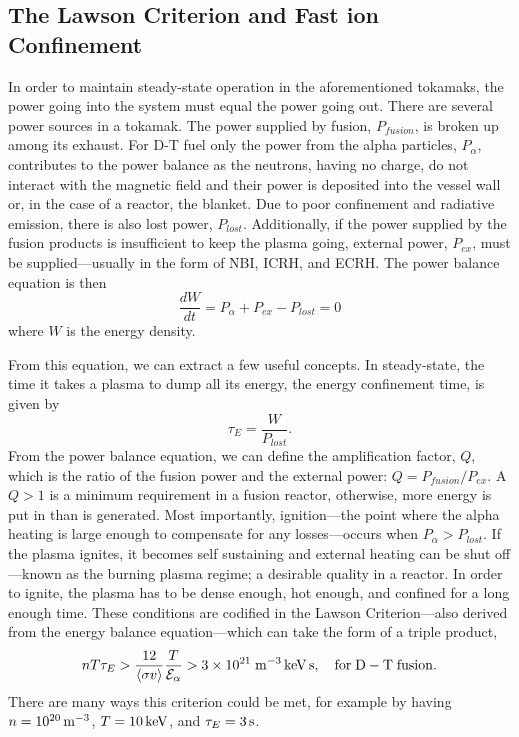 \subsection{The Lawson Criterion and Fast ion Confinement}
In order to maintain steady-state operation in the aforementioned tokamaks, the power going into the system must equal the power going out. There are several power sources in a tokamak. The power supplied by fusion, $P_{fusion}$, is broken up among its exhaust. For D-T fuel only the power from the alpha particles, $P_\alpha$, contributes to the power balance as the neutrons, having no charge, do not interact with the magnetic field and their power is deposited into the vessel wall or, in the case of a reactor, the blanket. Due to poor confinement and radiative emission, there is also lost power, $P_{lost}$. Additionally, if the power supplied by the fusion products is insufficient to keep the plasma going, external power, $P_{ex}$, must be supplied---usually in the form of NBI, ICRH, and ECRH. The power balance equation is then
\begin{equation}\label{eq:power_balance}
    \frac{dW}{dt} = P_\alpha + P_{ex} - P_{lost} = 0
\end{equation}
where $W$ is the energy density.

From this equation, we can extract a few useful concepts. In steady-state, the time it takes a plasma to dump all its energy, the energy confinement time, is given by
\begin{equation}\label{eq:tau_e}
    \tau_E = \frac{W}{P_{lost}}.
\end{equation}
From the power balance equation, we can define the amplification factor, $Q$, which is the ratio of the fusion power and the external power: $Q = P_{fusion}/P_{ex}$. A $Q > 1$ is a minimum requirement in a fusion reactor, otherwise, more energy is put in than is generated. Most importantly, ignition---the point where the alpha heating is large enough to compensate for any losses---occurs when $P_\alpha > P_{lost}$. If the plasma ignites, it becomes self sustaining and external heating can be shut off---known as the burning plasma regime; a desirable quality in a reactor.
In order to ignite, the plasma has to be dense enough, hot enough, and confined for a long enough time. These conditions are codified in the Lawson Criterion---also derived from the energy balance equation---which can take the form of a triple product,
\begin{equation}\label{eq:lawson}
    nT\tau_E > \frac{12}{\langle \sigma v \rangle} \frac{T}{\mathcal{E}_\alpha} > 3\times10^{21} \; \rm{m^{-3}\, keV\, s}, \quad \rm{for\;D-T\;fusion}.
\end{equation}
There are many ways this criterion could be met, for example by having $n = 10^{20}\, \rm{m^{-3}}$, $T = 10\,\rm{keV}$, and $\tau_E = 3\,\rm{s}$.

